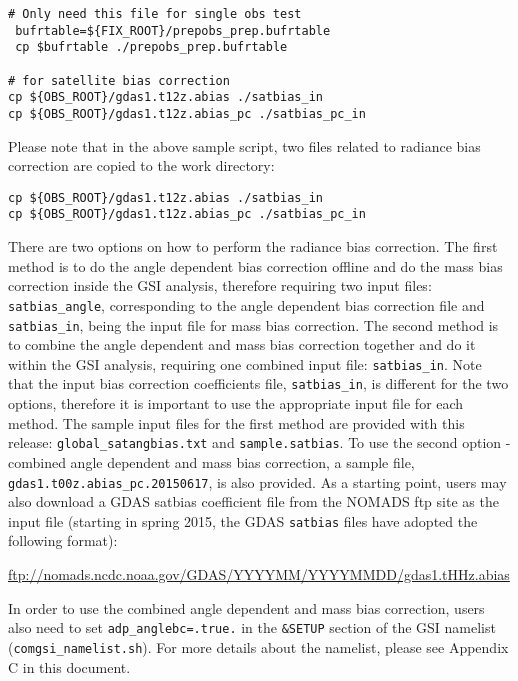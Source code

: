 \begin{footnotesize}
\begin{verbatim}
# Only need this file for single obs test
 bufrtable=${FIX_ROOT}/prepobs_prep.bufrtable
 cp $bufrtable ./prepobs_prep.bufrtable

# for satellite bias correction
cp ${OBS_ROOT}/gdas1.t12z.abias ./satbias_in
cp ${OBS_ROOT}/gdas1.t12z.abias_pc ./satbias_pc_in
\end{verbatim}
\end{footnotesize}

Please note that in the above sample script, two files related to radiance bias correction are copied to the work directory: 

\begin{small}
\begin{verbatim}
cp ${OBS_ROOT}/gdas1.t12z.abias ./satbias_in
cp ${OBS_ROOT}/gdas1.t12z.abias_pc ./satbias_pc_in
\end{verbatim}
\end{small}

There are two options on how to perform the radiance bias correction. The first method is to do the angle dependent bias correction offline and do the mass bias correction inside the GSI analysis, therefore requiring two input files: \verb|satbias_angle|, corresponding to the angle dependent bias correction file and \verb|satbias_in|, being the input file for mass bias correction. The second method is to combine the angle dependent and mass bias correction together and do it within the GSI analysis, requiring one combined input file: \verb|satbias_in|. Note that the input bias correction coefficients file, \verb|satbias_in|, is different for the two options, therefore it is important to use the appropriate input file for each method. The sample input files for the first method are provided with this release: \verb|global_satangbias.txt| and \verb|sample.satbias|. To use the second option - combined angle dependent and mass bias correction, a sample file, \verb|gdas1.t00z.abias_pc.20150617|, is also provided. As a starting point, users may also download a GDAS satbias coefficient file from the NOMADS ftp site as the input file (starting in spring 2015, the GDAS \verb|satbias| files have adopted the following format):

\url{ftp://nomads.ncdc.noaa.gov/GDAS/YYYYMM/YYYYMMDD/gdas1.tHHz.abias} 

In order to use the combined angle dependent and mass bias correction, users also need to set \verb|adp_anglebc=.true.| in the \verb|&SETUP| section of the GSI namelist (\verb|comgsi_namelist.sh|).  For more details about the namelist, please see Appendix C in this document. 

